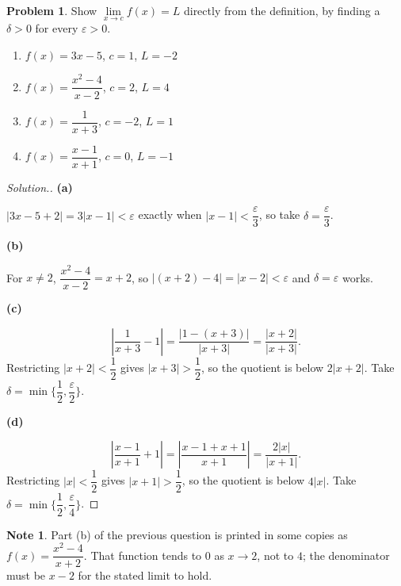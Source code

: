 \documentclass[11pt,a4paper]{article}
\theoremstyle{definition}
\newtheorem*{note}{Note}
\newtheorem{problemx}{Problem}[subsection]
\newenvironment{problem}{\begin{problemx}}{\end{problemx}}
\newenvironment{solution}
  {\renewcommand{\qedsymbol}{}\begin{proof}[\textit{Solution}.]}
  {\end{proof}}
\newcommand{\subhead}[1]{%
  \par\medskip\noindent\textbf{#1}\par\nobreak\smallskip}
\begin{document}
\begin{problem}
Show $\lim\limits_{x\rightarrow c}f(x) = L$ directly from the definition, by
finding a $\delta>0$ for every $\varepsilon>0$.
\begin{enumerate}
\item[(a)] $f(x) = 3x-5$, $c=1$, $L=-2$
\item[(b)] $f(x) = \dfrac{x^2-4}{x-2}$, $c=2$, $L=4$
\item[(c)] $f(x) = \dfrac{1}{x+3}$, $c=-2$, $L=1$
\item[(d)] $f(x) = \dfrac{x-1}{x+1}$, $c=0$, $L=-1$
\end{enumerate}
\end{problem}
\begin{solution}
\subhead{(a)}
$\left|3x-5+2\right| = 3\left|x-1\right| < \varepsilon$ exactly when
$\left|x-1\right| < \dfrac{\varepsilon}{3}$, so take
$\delta = \dfrac{\varepsilon}{3}$.

\subhead{(b)}
For $x\neq 2$, $\dfrac{x^2-4}{x-2} = x+2$, so
$\left|(x+2)-4\right| = \left|x-2\right| < \varepsilon$ and
$\delta = \varepsilon$ works.

\subhead{(c)}
$$\left|\frac{1}{x+3} - 1\right| = \frac{\left|1-(x+3)\right|}{\left|x+3\right|}
= \frac{\left|x+2\right|}{\left|x+3\right|}.$$
Restricting $\left|x+2\right| < \dfrac12$ gives $\left|x+3\right| > \dfrac12$,
so the quotient is below $2\left|x+2\right|$. Take
$\delta = \min\Big\{\dfrac12, \dfrac{\varepsilon}{2}\Big\}$.

\subhead{(d)}
$$\left|\frac{x-1}{x+1} + 1\right| = \left|\frac{x-1+x+1}{x+1}\right|
= \frac{2\left|x\right|}{\left|x+1\right|}.$$
Restricting $\left|x\right| < \dfrac12$ gives $\left|x+1\right| > \dfrac12$, so
the quotient is below $4\left|x\right|$. Take
$\delta = \min\Big\{\dfrac12, \dfrac{\varepsilon}{4}\Big\}$.
\end{solution}

\begin{note}
Part (b) of the previous question is printed in some copies as
$f(x) = \dfrac{x^2-4}{x+2}$. That function tends to $0$ as $x\rightarrow 2$, not
to $4$; the denominator must be $x-2$ for the stated limit to hold.
\end{note}
\end{document}
